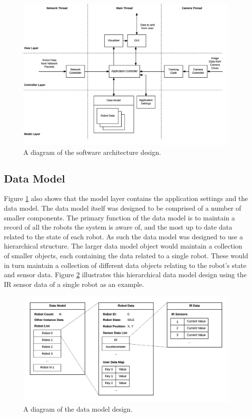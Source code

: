 \begin{figure}
	\centering
	\includegraphics[scale=0.7]{Figures/SoftwareArchitecture.png}
	\decoRule
	\caption[Software Architecture Diagram]{A diagram of the software architecture design.}
	\label{fig:SoftwareArchitecture}
\end{figure}

\subsection{Data Model}
Figure \ref{fig:SoftwareArchitecture} also shows that the model layer contains the application settings and the data model. The data model itself was designed to be comprised of a number of smaller components. The primary function of the data model is to maintain a record of all the robots the system is aware of, and the most up to date data related to the state of each robot. As such the data model was designed to use a hierarchical structure. The larger data model object would maintain a collection of smaller objects, each containing the data related to a single robot. These would in turn maintain a collection of different data objects relating to the robot's state and sensor data. Figure \ref{fig:DataModel} illustrates this hierarchical data model design using the IR sensor data of a single robot as an example.

\begin{figure}
	\centering
	\includegraphics[scale=0.7]{Figures/DataModel.png}
	\decoRule
	\caption[Data Model Diagram]{A diagram of the data model design.}
	\label{fig:DataModel}
\end{figure}

